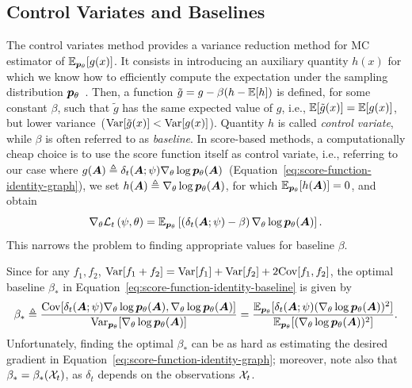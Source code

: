 \subsection{Control Variates and Baselines} 

The control variates method provides a variance reduction method for MC estimator of $\mathbb{E}_{{\bm{p}}_\theta}[g(x)]$. It consists in introducing an auxiliary quantity $h(x)$ for which we know how to efficiently compute the expectation under the sampling distribution ${{\bm{p}}_\theta}$~\citep{mohamed2020monte}. Then, a function ${\tilde g=g-\beta(h - \mathbb{E}[h])}$ is defined, for some constant $\beta$, such that $\tilde g$ has the same expected value of $g$, i.e., $\mathbb{E}[\tilde g(x)]=\mathbb{E}[g(x)]$, but lower variance~($\mathrm{Var}[\tilde g(x)]<\mathrm{Var}[g(x)]$). Quantity $h$ is called \emph{control variate}, while $\beta$ is often referred to as \emph{baseline}.
In score-based methods, a computationally cheap choice is to use the score function itself as control variate, i.e., referring to our case where $g({\bm{A}}) \triangleq \delta_t({\bm{A}};\psi)\nabla_\theta \log {{\bm{p}}_\theta}({\bm{A}})$~(Equation~\eqref{eq:score-function-identity-graph}), we set $h({\bm{A}}) \triangleq \nabla_\theta\log{{\bm{p}}_\theta}({\bm{A}})$, for which $\mathbb{E}_{{\bm{p}}_\theta}[h({\bm{A}})]=0$, and obtain
\begin{equation}\label{eq:score-function-identity-baseline}
\nabla_\theta\mathcal{L}_t\left(\psi,\theta\right)
= \mathbb{E}_{{{\bm{p}}_\theta}}\left[\left(\delta_t({\bm{A}};\psi)-\beta\right)\nabla_\theta \log {{\bm{p}}_\theta}({\bm{A}})\right].
\end{equation}
This narrows the problem to finding appropriate values for baseline $\beta$.

Since for any $f_1,f_2$, $\mathrm{Var}[f_1+f_2]=\mathrm{Var}[f_1] + \mathrm{Var}[f_2] + 2\mathrm{Cov}[f_1,f_2]$, the optimal baseline $\beta_*$ in Equation~\eqref{eq:score-function-identity-baseline} is given by
\begin{equation}\label{eq:beta-star}
\beta_*
\triangleq\frac{\mathrm{Cov}[\delta_t({\bm{A}};\psi)\nabla_\theta\log{{\bm{p}}_\theta}({\bm{A}}),\nabla_\theta\log{{\bm{p}}_\theta}({\bm{A}})]}{\mathrm{Var}_{{\bm{p}}_\theta}[\nabla_\theta\log{{\bm{p}}_\theta}({\bm{A}})]}
=\frac{\mathbb{E}_{{\bm{p}}_\theta}[\delta_t({\bm{A}};\psi)(\nabla_\theta\log{{\bm{p}}_\theta}({\bm{A}}))^{ 2}]}{\mathbb{E}_{{\bm{p}}_\theta}[(\nabla_\theta\log{{\bm{p}}_\theta}({\bm{A}}))^2]}. 
\end{equation}
Unfortunately, finding the optimal $\beta_*$ can be as hard as estimating the desired gradient in Equation~\eqref{eq:score-function-identity-graph}; moreover, note also that $\beta_*=\beta_*({\mathcal{X}}_t)$, as $\delta_t$ depends on the observations ${\mathcal{X}}_t$. 


